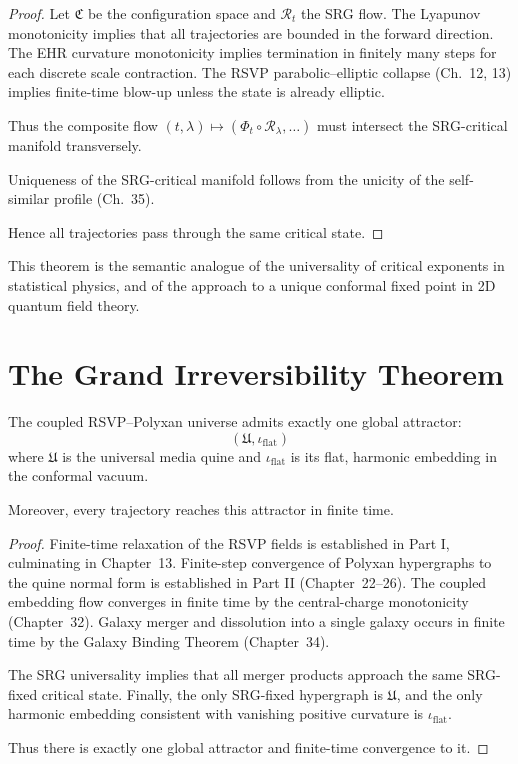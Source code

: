 \begin{proof}
Let $\mathfrak{C}$ be the configuration space and $\mathcal{R}_t$ the SRG flow.  
The Lyapunov monotonicity implies that all trajectories are bounded in the forward direction.  
The EHR curvature monotonicity implies termination in finitely many steps for each discrete scale contraction.  
The RSVP parabolic–elliptic collapse (Ch.~12, 13) implies finite-time blow-up unless the state is already elliptic.

Thus the composite flow $(t,\lambda)\mapsto (\Phi_t\circ\mathcal{R}_\lambda,\dots)$ must intersect the SRG-critical manifold transversely.

Uniqueness of the SRG-critical manifold follows from the unicity of the self-similar profile (Ch.~35).

Hence all trajectories pass through the same critical state.
\end{proof}

This theorem is the semantic analogue of the universality of critical exponents in statistical physics, and of the approach to a unique conformal fixed point in 2D quantum field theory.

\section{The Grand Irreversibility Theorem}

\begin{theorem}
\label{thm:grand-irreversibility}
The coupled RSVP--Polyxan universe admits exactly one global attractor:
\[
(\mathfrak{U}, \iota_{\mathrm{flat}})
\]
where $\mathfrak{U}$ is the universal media quine and $\iota_{\mathrm{flat}}$ is its flat, harmonic embedding in the conformal vacuum.

Moreover, every trajectory reaches this attractor in finite time.
\end{theorem}

\begin{proof}
Finite-time relaxation of the RSVP fields is established in Part I, culminating in Chapter~13.  
Finite-step convergence of Polyxan hypergraphs to the quine normal form is established in Part II (Chapter~22--26).  
The coupled embedding flow converges in finite time by the central-charge monotonicity (Chapter~32).  
Galaxy merger and dissolution into a single galaxy occurs in finite time by the Galaxy Binding Theorem (Chapter~34).

The SRG universality implies that all merger products approach the same SRG-fixed critical state.  
Finally, the only SRG-fixed hypergraph is $\mathfrak{U}$, and the only harmonic embedding consistent with vanishing positive curvature is $\iota_{\mathrm{flat}}$.

Thus there is exactly one global attractor and finite-time convergence to it.
\end{proof}

